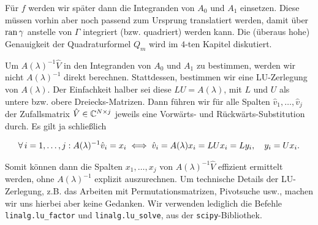 Für $f$ werden wir später dann die Integranden von $A_0$ und $A_1$ einsetzen.
Diese müssen vorhin aber noch passend zum Ursprung translatiert werden, damit über $\operatorname{ran} \gamma$ anstelle von $\Gamma$ integriert (bzw. quadriert) werden kann.
Die (überaus hohe) Genauigkeit der Quadraturformel $Q_m$ wird im $4$-ten Kapitel diskutiert.

Um $A(\lambda)^{-1} \hat V$ in den Integranden von $A_0$ und $A_1$ zu bestimmen, werden wir nicht $A(\lambda)^{-1}$ direkt berechnen.
Stattdessen, bestimmen wir eine LU-Zerlegung von $A(\lambda)$.
Der Einfachkeit halber sei diese $L U = A(\lambda)$, mit $L$ und $U$ als untere bzw. obere Dreiecks-Matrizen.
Dann führen wir für alle Spalten $\hat v_1, \dots, \hat v_j$ der Zufallsmatrix $\hat V \in \mathbb{C}^{N \times j}$ jeweils eine Vorwärts- und Rückwärts-Substitution durch.
Es gilt ja schließlich

\begin{align*}
    \forall \, i = 1, \dots, j:
        A(\lambda)^{-1} \hat v_i = x_i
        \iff
        \hat v_i = A(\lambda) x_i = L U x_i = L y_i,
        \quad
        y_i = U x_i.
\end{align*}

Somit können dann die Spalten $x_1, \dots, x_j$ von $A(\lambda)^{-1} \hat V$ effizient ermittelt werden, ohne $A(\lambda)^{-1}$ explizit auszurechnen.
Um technische Details der LU-Zerlegung, z.B. das Arbeiten mit Permutationsmatrizen, Pivotsuche usw., machen wir uns hierbei aber keine Gedanken.
Wir verwenden lediglich die Befehle \texttt{linalg.lu\_factor} und \texttt{linalg.lu\_solve}, aus der \texttt{scipy}-Bibliothek.
